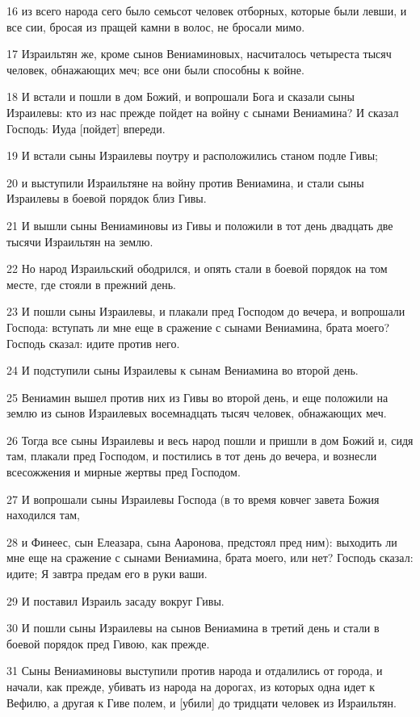 \par 16 из всего народа сего было семьсот человек отборных, которые были левши, и все сии, бросая из пращей камни в волос, не бросали мимо.
\par 17 Израильтян же, кроме сынов Вениаминовых, насчиталось четыреста тысяч человек, обнажающих меч; все они были способны к войне.
\par 18 И встали и пошли в дом Божий, и вопрошали Бога и сказали сыны Израилевы: кто из нас прежде пойдет на войну с сынами Вениамина? И сказал Господь: Иуда [пойдет] впереди.
\par 19 И встали сыны Израилевы поутру и расположились станом подле Гивы;
\par 20 и выступили Израильтяне на войну против Вениамина, и стали сыны Израилевы в боевой порядок близ Гивы.
\par 21 И вышли сыны Вениаминовы из Гивы и положили в тот день двадцать две тысячи Израильтян на землю.
\par 22 Но народ Израильский ободрился, и опять стали в боевой порядок на том месте, где стояли в прежний день.
\par 23 И пошли сыны Израилевы, и плакали пред Господом до вечера, и вопрошали Господа: вступать ли мне еще в сражение с сынами Вениамина, брата моего? Господь сказал: идите против него.
\par 24 И подступили сыны Израилевы к сынам Вениамина во второй день.
\par 25 Вениамин вышел против них из Гивы во второй день, и еще положили на землю из сынов Израилевых восемнадцать тысяч человек, обнажающих меч.
\par 26 Тогда все сыны Израилевы и весь народ пошли и пришли в дом Божий и, сидя там, плакали пред Господом, и постились в тот день до вечера, и вознесли всесожжения и мирные жертвы пред Господом.
\par 27 И вопрошали сыны Израилевы Господа (в то время ковчег завета Божия находился там,
\par 28 и Финеес, сын Елеазара, сына Ааронова, предстоял пред ним): выходить ли мне еще на сражение с сынами Вениамина, брата моего, или нет? Господь сказал: идите; Я завтра предам его в руки ваши.
\par 29 И поставил Израиль засаду вокруг Гивы.
\par 30 И пошли сыны Израилевы на сынов Вениамина в третий день и стали в боевой порядок пред Гивою, как прежде.
\par 31 Сыны Вениаминовы выступили против народа и отдалились от города, и начали, как прежде, убивать из народа на дорогах, из которых одна идет к Вефилю, а другая к Гиве полем, и [убили] до тридцати человек из Израильтян.
